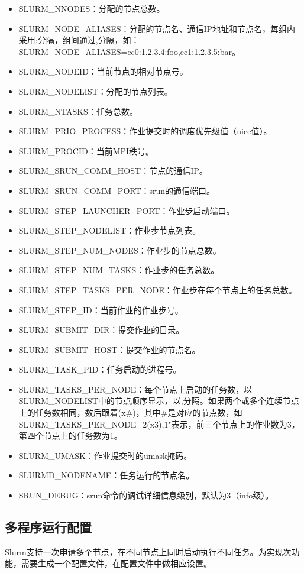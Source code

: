 \begin{itemize}
	\item SLURM\_NNODES：分配的节点总数。
	\item SLURM\_NODE\_ALIASES：分配的节点名、通信IP地址和节点名，每组内采用:分隔，组间通过,分隔，如：SLURM\_NODE\_ALIASES=ec0:1.2.3.4:foo,ec1:1.2.3.5:bar。
	\item SLURM\_NODEID：当前节点的相对节点号。
	\item SLURM\_NODELIST：分配的节点列表。
	\item SLURM\_NTASKS：任务总数。
	\item SLURM\_PRIO\_PROCESS：作业提交时的调度优先级值（nice值）。
	\item SLURM\_PROCID：当前MPI秩号。
	\item SLURM\_SRUN\_COMM\_HOST：节点的通信IP。
	\item SLURM\_SRUN\_COMM\_PORT：srun的通信端口。
	\item SLURM\_STEP\_LAUNCHER\_PORT：作业步启动端口。
	\item SLURM\_STEP\_NODELIST：作业步节点列表。
	\item SLURM\_STEP\_NUM\_NODES：作业步的节点总数。
	\item SLURM\_STEP\_NUM\_TASKS：作业步的任务总数。
	\item SLURM\_STEP\_TASKS\_PER\_NODE：作业步在每个节点上的任务总数。
	\item SLURM\_STEP\_ID：当前作业的作业步号。
	\item SLURM\_SUBMIT\_DIR：提交作业的目录。
	\item SLURM\_SUBMIT\_HOST：提交作业的节点名。
	\item SLURM\_TASK\_PID：任务启动的进程号。
	\item SLURM\_TASKS\_PER\_NODE：每个节点上启动的任务数，以SLURM\_NODELIST中的节点顺序显示，以,分隔。如果两个或多个连续节点上的任务数相同，数后跟着(x\#)，其中\#是对应的节点数，如SLURM\_TASKS\_PER\_NODE=2(x3),1"表示，前三个节点上的作业数为3，第四个节点上的任务数为1。
	\item SLURM\_UMASK：作业提交时的umask掩码。
	\item SLURMD\_NODENAME：任务运行的节点名。
	\item SRUN\_DEBUG：srun命令的调试详细信息级别，默认为3（info级）。
\end{itemize}

\subsection{多程序运行配置}
Slurm支持一次申请多个节点，在不同节点上同时启动执行不同任务。为实现次功能，需要生成一个配置文件，在配置文件中做相应设置。


